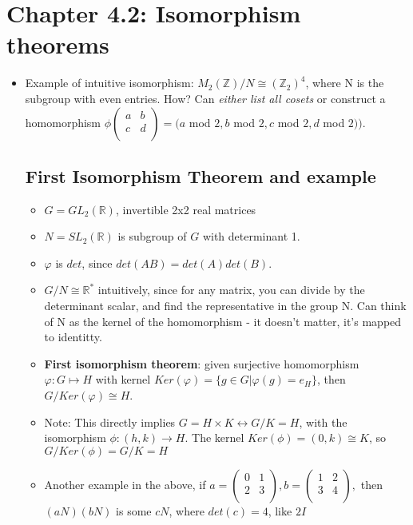 \documentclass[11pt, oneside]{article}   	%
\begin{document}
\section{Chapter 4.2: Isomorphism theorems}
\begin {itemize}
\item Example of intuitive isomorphism: $M_2(\mathbb{Z})/N \cong (\mathbb{Z}_2)^4$, where N is the subgroup with even entries.   How?  Can \emph{either list all cosets} or construct a homomorphism $\phi
   \begin{pmatrix}
    a     & b \\
   c     & d \\
  \end{pmatrix}
    = (a $ mod $2, b $ mod $ 2, c $ mod $ 2, d $ mod $2 )).$

\subsection{First Isomorphism Theorem and example}
  \begin{itemize} 
  \item $G = GL_2(\mathbb{R})$, invertible 2x2 real matrices
  \item $N = SL_2(\mathbb{R})$ is subgroup of $G$ with determinant 1.
  \item $\varphi$ is $det$, since $det(AB) = det(A)det(B)$.
  \item $G / N \cong \mathbb{R}^*$ intuitively, since for any matrix, you can divide by the determinant scalar, and find the representative in the group N.   Can think of N as the kernel of the homomorphism - it doesn't matter, it's mapped to identitty.
  \item \textbf{First isomorphism theorem}: given surjective homomorphism $\varphi: G \mapsto H$ with kernel $Ker(\varphi) = \{g \in G |\varphi(g) = e_H\}$, then $G / Ker(\varphi) \cong H$. 
  \item Note: This directly implies $G = H \times K \leftrightarrow G / K = H$, with the isomorphism $\phi: (h,k) \rightarrow H$.  The kernel $Ker(\phi) = (0, k) \cong K$, so $ G / Ker(\phi) = G / K = H$
  \item Another example in the above, if 
    $a= \begin{pmatrix} 0 & 1 \\ 2 & 3 \\   \end{pmatrix},
     b= \begin{pmatrix} 1 & 2 \\ 3 & 4 \\   \end{pmatrix},$ then $(aN)(bN)$ is some $cN$, where $det(c) = 4$, like $2I$
  \end{itemize}
  \end{itemize}
\end{document}
